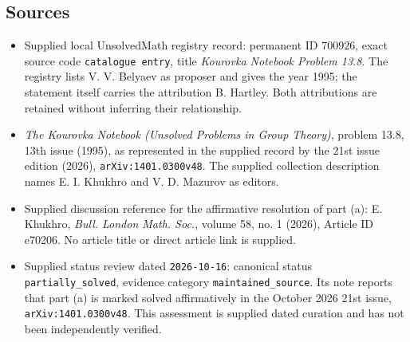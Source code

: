 \documentclass[11pt]{article}
\begin{document}
\subsection{Sources}
\begin{itemize}
\item Supplied local UnsolvedMath registry record: permanent ID \(700926\), exact source code \texttt{catalogue entry}, title \emph{Kourovka Notebook Problem 13.8}. The registry lists V. V. Belyaev as proposer and gives the year 1995; the statement itself carries the attribution B. Hartley. Both attributions are retained without inferring their relationship.
\item \emph{The Kourovka Notebook (Unsolved Problems in Group Theory)}, problem 13.8, 13th issue (1995), as represented in the supplied record by the 21st issue edition (2026), \texttt{arXiv:1401.0300v48}. The supplied collection description names E. I. Khukhro and V. D. Mazurov as editors.
\item Supplied discussion reference for the affirmative resolution of part (a): E. Khukhro, \emph{Bull. London Math. Soc.}, volume 58, no. 1 (2026), Article ID e70206. No article title or direct article link is supplied.
\item Supplied status review dated \texttt{2026-10-16}: canonical status \texttt{partially\_solved}, evidence category \texttt{maintained\_source}. Its note reports that part (a) is marked solved affirmatively in the October 2026 21st issue, \texttt{arXiv:1401.0300v48}. This assessment is supplied dated curation and has not been independently verified.
\end{itemize}
\end{document}
